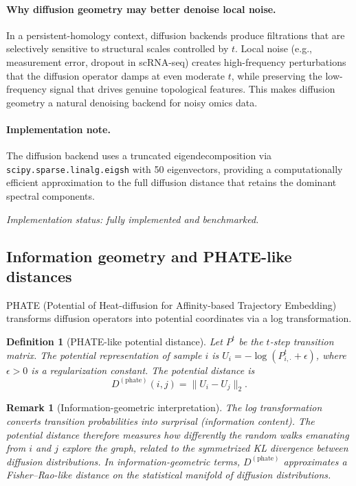 \documentclass[11pt]{article}
\newtheorem{definition}[theorem]{Definition}
\newtheorem{remark}[theorem]{Remark}
\begin{document}
\paragraph{Why diffusion geometry may better denoise local noise.}
In a persistent-homology context, diffusion backends produce filtrations that are selectively sensitive to structural scales controlled by $t$.
Local noise (e.g., measurement error, dropout in scRNA-seq) creates high-frequency perturbations that the diffusion operator damps at even moderate $t$, while preserving the low-frequency signal that drives genuine topological features.
This makes diffusion geometry a natural denoising backend for noisy omics data.

\paragraph{Implementation note.}
The diffusion backend uses a truncated eigendecomposition via \texttt{scipy.sparse.linalg.eigsh} with 50 eigenvectors, providing a computationally efficient approximation to the full diffusion distance that retains the dominant spectral components.

\emph{Implementation status: fully implemented and benchmarked.}

\subsection{Information geometry and PHATE-like distances}
\label{sec:phate}

PHATE (Potential of Heat-diffusion for Affinity-based Trajectory Embedding) \cite{moon2019phate} transforms diffusion operators into potential coordinates via a log transformation.

\begin{definition}[PHATE-like potential distance]\label{def:phate}
Let $P^t$ be the $t$-step transition matrix.
The \emph{potential representation} of sample $i$ is $U_i = -\log(P^t_{i,\cdot} + \epsilon)$, where $\epsilon > 0$ is a regularization constant.
The \emph{potential distance} is
\[
D^{(\text{phate})}(i,j) = \|U_i - U_j\|_2.
\]
\end{definition}

\begin{remark}[Information-geometric interpretation]\label{rem:phate_info}
The log transformation converts transition probabilities into surprisal (information content).
The potential distance therefore measures how differently the random walks emanating from $i$ and $j$ explore the graph, related to the symmetrized KL divergence between diffusion distributions.
In information-geometric terms, $D^{(\text{phate})}$ approximates a Fisher--Rao-like distance on the statistical manifold of diffusion distributions.
\end{remark}
\end{document}

